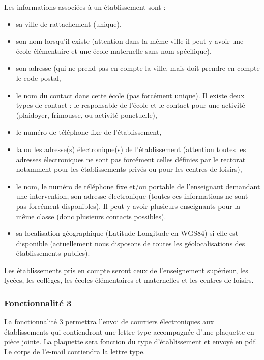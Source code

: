 Les informations associées à un établissement sont :
\begin{itemize}
\item sa ville de rattachement (unique), 
\item son nom lorsqu'il existe (attention dans la même ville il peut y avoir une école élémentaire et une école maternelle sans nom spécifique), 
\item son adresse (qui ne prend pas en compte la ville, mais doit prendre en compte le code postal, 
\item le nom du contact dans cette école (pas forcément unique). Il existe deux types de contact : le responsable de l'école et le contact pour une activité (plaidoyer, frimousse, ou activité ponctuelle), 
\item le numéro de téléphone fixe de l'établissement, 
\item la ou les adresse(s) électronique(s) de l'établissement (attention toutes les adresses électroniques ne sont pas forcément celles définies par le rectorat notamment pour les établissements privés ou pour les centres de loisirs), 
\item le nom, le numéro de téléphone fixe et/ou portable de l'enseignant demandant une intervention, son adresse électronique (toutes ces informations ne sont pas forcément disponibles). Il peut y avoir plusieurs enseignants pour la même classe (donc plusieurs contacts possibles).
\item sa localisation géographique (Latitude-Longitude en WGS84) si elle est disponible
(actuellement nous disposons de toutes les géolocalisations des établissements publics).\\
\end{itemize}

Les établissements pris en compte seront ceux de l'enseignement supérieur, les lycées, les collèges, les écoles élémentaires et maternelles et les centres de loisirs. 


\subsubsection{Fonctionnalité 3}
La fonctionnalité 3 permettra l'envoi de courriers électroniques aux établissements qui contiendront une lettre type accompagnée d'une plaquette en pièce jointe. La plaquette sera fonction du type d'établissement et envoyé en pdf. Le corps de l'e-mail contiendra la lettre type. 

